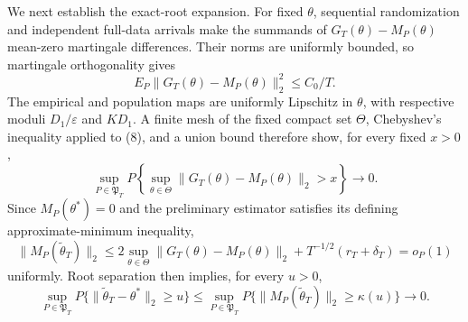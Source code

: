 We next establish the exact-root expansion. For fixed \(\theta\), sequential randomization and independent full-data arrivals make the summands of \(G_T(\theta)-M_P(\theta)\) mean-zero martingale differences. Their norms are uniformly bounded, so martingale orthogonality gives
\[
 E_P\|G_T(\theta)-M_P(\theta)\|_2^2\le C_0/T. \tag{8}
\]
The empirical and population maps are uniformly Lipschitz in \(\theta\), with respective moduli \(D_1/\varepsilon\) and \(KD_1\). A finite mesh of the fixed compact set \(\Theta\), Chebyshev's inequality applied to (8), and a union bound therefore show, for every fixed \(x>0\),
\[
 \sup_{P\in\mathfrak P_T}P\left\{\sup_{\theta\in\Theta}
 \|G_T(\theta)-M_P(\theta)\|_2>x\right\}\longrightarrow0. \tag{9}
\]
Since \(M_P(\theta^*)=0\) and the preliminary estimator satisfies its defining approximate-minimum inequality,
\[
 \|M_P(\widetilde\theta_T)\|_2
 \le2\sup_{\theta\in\Theta}\|G_T(\theta)-M_P(\theta)\|_2
 +T^{-1/2}(r_T+\delta_T)=o_P(1) \tag{10}
\]
uniformly. Root separation then implies, for every \(u>0\),
\[
 \sup_{P\in\mathfrak P_T}P\{\|\widetilde\theta_T-\theta^*\|_2\ge u\}
 \le\sup_{P\in\mathfrak P_T}P\{\|M_P(\widetilde\theta_T)\|_2\ge\kappa(u)\}
 \longrightarrow0. \tag{11}
\]

